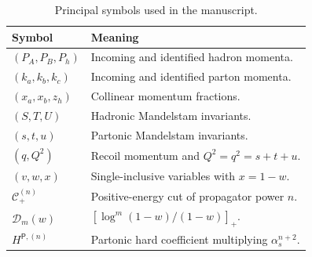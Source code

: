 \begin{table}[htbp]
\centering
\small
\begin{tabularx}{\textwidth}{@{}L{0.22\textwidth}Y@{}}
\toprule
Symbol & Meaning\\
\midrule
$(P_A,P_B,P_h)$ & Incoming and identified hadron momenta.\\
$(k_a,k_b,k_c)$ & Incoming and identified parton momenta.\\
$(x_a,x_b,z_h)$ & Collinear momentum fractions.\\
$(S,T,U)$ & Hadronic Mandelstam invariants.\\
$(s,t,u)$ & Partonic Mandelstam invariants.\\
$(q,Q^2)$ & Recoil momentum and $Q^2=q^2=s+t+u$.\\
$(v,w,x)$ & Single-inclusive variables with $x=1-w$.\\
$\mathcal C_+^{(n)}$ & Positive-energy cut of propagator power $n$.\\
$\mathcal D_m(w)$ & $[\log^m(1-w)/(1-w)]_+$.\\
$H^{\mathsf P,(n)}$ & Partonic hard coefficient multiplying
$\alpha_s^{n+2}$.\\
\bottomrule
\end{tabularx}
\caption{Principal symbols used in the manuscript.}
\label{tab:symbols}
\end{table}
